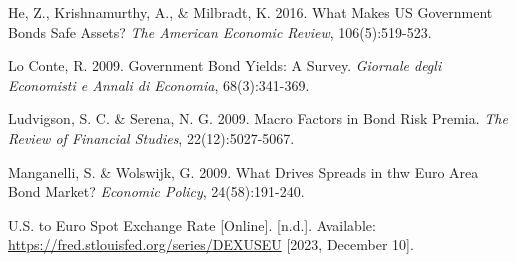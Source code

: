 \documentclass[11pt,preprint, authoryear]{elsarticle}
\numberwithin{equation}{section}
\numberwithin{figure}{section}
\numberwithin{table}{section}
\begin{document}
He, Z., Krishnamurthy, A., \& Milbradt, K. 2016. What Makes US
Government Bonds Safe Assets? \emph{The American Economic Review},
106(5):519-523.

Lo Conte, R. 2009. Government Bond Yields: A Survey. \emph{Giornale
degli Economisti e Annali di Economia}, 68(3):341-369.

Ludvigson, S. C. \& Serena, N. G. 2009. Macro Factors in Bond Risk
Premia. \emph{The Review of Financial Studies}, 22(12):5027-5067.

Manganelli, S. \& Wolswijk, G. 2009. What Drives Spreads in thw Euro
Area Bond Market? \emph{Economic Policy}, 24(58):191-240.

U.S. to Euro Spot Exchange Rate {[}Online{]}. {[}n.d.{]}. Available:
\url{https://fred.stlouisfed.org/series/DEXUSEU} {[}2023, December
10{]}.


\end{document}
